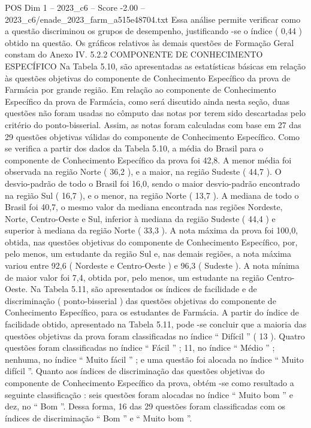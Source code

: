 \begin{textsample}{POS Dim 1 – 2023\_c6 – Score -2.00 – 2023\_c6/enade\_2023\_farm\_a515e48704.txt}
Essa análise permite verificar como a questão discriminou os grupos de desempenho, justificando -se o índice ( 0,44 ) obtido na questão.
Os gráficos relativos às demais questões de Formação Geral constam do Anexo IV. 5.2.2 COMPONENTE DE CONHECIMENTO ESPECÍFICO Na Tabela 5.10, são apresentadas as estatísticas básicas em relação às questões objetivas do componente de Conhecimento Específico da prova de Farmácia por grande região.
Em relação ao componente de Conhecimento Específico da prova de Farmácia, como será discutido ainda nesta seção, duas questões não foram usadas no cômputo das notas por terem sido descartadas pelo critério do ponto-bisserial.
Assim, as notas foram calculadas com base em 27 das 29 questões objetivas válidas do componente de Conhecimento Específico.
Como se verifica a partir dos dados da Tabela 5.10, a média do Brasil para o componente de Conhecimento Específico da prova foi 42,8.
A menor média foi observada na região Norte ( 36,2 ), e a maior, na região Sudeste ( 44,7 ).
O desvio-padrão de todo o Brasil foi 16,0, sendo o maior desvio-padrão encontrado na região Sul ( 16,7 ), e o menor, na região Norte ( 13,7 ).
A mediana de todo o Brasil foi 40,7, o mesmo valor da mediana encontrada nas regiões Nordeste, Norte, Centro-Oeste e Sul, inferior à mediana da região Sudeste ( 44,4 ) e superior à mediana da região Norte ( 33,3 ).
A nota máxima da prova foi 100,0, obtida, nas questões objetivas do componente de Conhecimento Específico, por, pelo menos, um estudante da região Sul e, nas demais regiões, a nota máxima variou entre 92,6 ( Nordeste e Centro-Oeste ) e 96,3 ( Sudeste ).
A nota mínima de maior valor foi 7,4, obtida por, pelo menos, um estudante na região Centro-Oeste.
Na Tabela 5.11, são apresentados os índices de facilidade e de discriminação ( ponto-bisserial ) das questões objetivas do componente de Conhecimento Específico, para os estudantes de Farmácia.
A partir do índice de facilidade obtido, apresentado na Tabela 5.11, pode -se concluir que a maioria das questões objetivas da prova foram classificadas no índice “ Difícil ” ( 13 ).
Quatro questões foram classificadas no índice “ Fácil ” ; 11, no índice “ Médio ” ; nenhuma, no índice “ Muito fácil ” ; e uma questão foi alocada no índice “ Muito difícil ”.
Quanto aos índices de discriminação das questões objetivas do componente de Conhecimento Específico da prova, obtém -se como resultado a seguinte classificação : seis questões foram alocadas no índice “ Muito bom ” e dez, no “ Bom ”.
Dessa forma, 16 das 29 questões foram classificadas com os índices de discriminação “ Bom ” e “ Muito bom ”.

\end{textsample}
